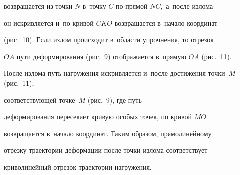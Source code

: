 возвращается из точки $N$ в~точку $C$ по прямой $NC,$ а~после излома

он искривляется и~по кривой $CKO$ возвращается в~начало координат

(рис.~10). Если излом происходит в~области упрочнения, то отрезок

$OA$ пути деформирования (рис.~9) отображается в~прямую $OA$ (рис.~11).

После излома путь нагружения искривляется и~после достижения точки~$M$ (рис.~11), 

соответствующей точке~$M$ (рис.~9), где путь

деформирования пересекает кривую особых точек, по кривой $MO$

возвращается в~начало координат. Таким образом, прямолинейному

отрезку траектории деформации после точки излома соответствует

криволинейный отрезок траектории нагружения.



